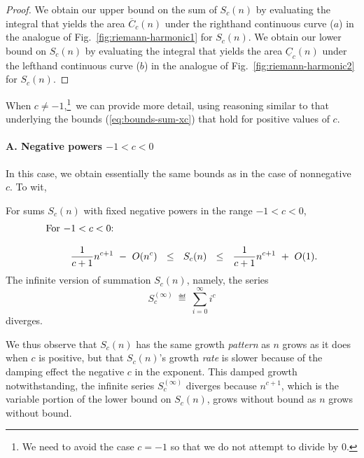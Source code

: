 \begin{proof}
We obtain our upper bound on the sum of $S_c(n)$ by evaluating the
integral that yields the area $\overline{C}_c(n)$ under the righthand
continuous curve ($a$) in the analogue of
Fig.~\ref{fig:riemann-harmonic1} for $S_c(n)$.  We obtain our lower
bound on $S_c(n)$ by evaluating the integral that yields the area
$\underline{C}_c(n)$ under the lefthand continuous curve ($b$) in the
analogue of Fig.~\ref{fig:riemann-harmonic2} for $S_c(n)$.
\end{proof}

When $c \neq -1$,\footnote{We need to avoid the case $c = -1$ so that
  we do not attempt to divide by $0$.}~we can provide more detail,
using reasoning similar to that underlying the bounds
(\ref{eq:bounds-sum-xc}) that hold for positive values of $c$.

\paragraph{\small\sf A. Negative powers $-1 < c < 0$}

In this case, we obtain essentially the same bounds as in the case of
nonnegative $c$.  To wit,

\begin{prop}
\label{thm:bounds-(-1)<c<0}
For sums $S_c(n)$ with fixed negative powers in the range $-1 < c<0$,
\begin{equation}
\label{eq:bounds-(-1)<c<0}
\begin{array}{l}
\mbox{For $-1 < c< 0$:} \\
 \\
\hspace*{.35in}
{\displaystyle \frac{1}{c+1} n^{c+1} \ - \ O(n^c)}
  \ \ \leq \ \ S_c(n)
  \ \ \leq \ \
{\displaystyle \frac{1}{c+1} n^{c+1} \ + \ O(1)}.
\end{array}
\end{equation}
The infinite version of summation $S_c(n)$, namely, the series
\[ S_c^{(\infty)} \ \eqdef \ \sum_{i=0}^\infty i^c \]
diverges.
\end{prop}

We thus observe that $S_c(n)$ has the same growth {\em pattern} as $n$
grows as it does when $c$ is positive, but that $S_c(n)$'s growth {\em
  rate} is slower because of the damping effect the negative $c$ in
the exponent.  This damped growth notwithstanding, the infinite series
$S_c^{(\infty)}$ diverges because $n^{c+1}$, which is the variable
portion of the lower bound on $S_c(n)$, grows without bound as $n$
grows without bound.

